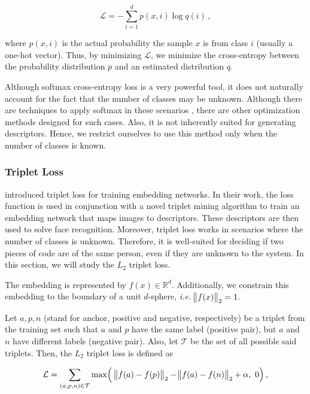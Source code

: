 \begin{equation}
\mathcal{L} = -\sum_{i=1}^d p(x, i) \log q(i) \,,
\end{equation}

where $p(x, i)$ is the actual probability the sample $x$ is from class $i$ (usually a one-hot vector). Thus, by minimizing $\mathcal{L}$, we minimize the cross-entropy between the probability distribution $p$ and an estimated distribution $q$.

Although softmax cross-entropy loss is a very powerful tool, it does not naturally account for the fact that the number of classes may be unknown. Although there are techniques to apply softmax in these scenarios \cite{softmax_trick1,softmax_trick2}, there are other optimization methods designed for such cases. Also, it is not inherently suited for generating descriptors. Hence, we restrict ourselves to use this method only when the number of classes is known.

\subsubsection{Triplet Loss}\label{sec:triplet}

 introduced triplet loss for training embedding networks. In their work, the loss function is used in conjunction with a novel triplet mining algorithm to train an embedding network that maps images to descriptors. These descriptors are then used to solve face recognition. Moreover, triplet loss works in scenarios where the number of classes is unknown. Therefore, it is well-suited for deciding if two pieces of code are of the same person, even if they are unknown to the system. In this section, we will study the $L_2$ triplet loss.

The embedding is represented by $f(x) \in \mathbb{R}^d$. Additionally, we constrain this embedding to the boundary of a unit $d$-sphere, \textit{i.e.} $\norm{f(x)}_2 = 1$.

Let $a, p, n$ (stand for anchor, positive and negative, respectively) be a triplet from the training set such that $a$ and $p$ have the same label (positive pair), but $a$ and $n$ have different labels (negative pair). Also, let $\mathcal{T}$ be the set of all possible said triplets. Then, the $L_2$ triplet loss is defined as

\begin{equation}\label{eq:triplet}
\mathcal{L} = \sum_{(a, p, n) \in \mathcal{T}} %
\max\Bigl(\ \norm{f(a) - f(p)}_2 - \norm{f(a) - f(n)}_2 + \alpha,\ 0\Bigr)\,,
\end{equation}

